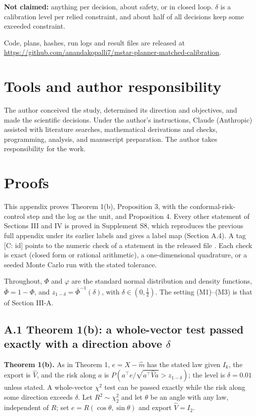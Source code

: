 \documentclass{ieeeaccess}
\begin{document}
\textbf{Not claimed:} anything per decision, about safety, or in closed loop. $\delta$ is a calibration level per relied constraint, and about half of all decisions keep some exceeded constraint.

Code, plans, hashes, run logs and result files are released at \url{https://github.com/anandakopalli7/mstar-planner-matched-calibration}.

\section*{Tools and author responsibility}
The author conceived the study, determined its direction and objectives, and made the scientific decisions. Under the author's instructions, Claude (Anthropic) assisted with literature searches, mathematical derivations and checks, programming, analysis, and manuscript preparation. The author takes responsibility for the work.

\appendices
\section{\break Proofs}
This appendix proves Theorem 1(b), Proposition 3, with the conformal-risk-control step and the log as the unit, and Proposition 4. Every other statement of Sections III and IV is proved in Supplement S8, which reproduces the previous full appendix under its earlier labels and gives a label map (Section A.4). A tag [C: id] points to the numeric check of a statement in the released file . Each check is exact (closed form or rational arithmetic), a one-dimensional quadrature, or a seeded Monte Carlo run with the stated tolerance.

Throughout, $\Phi$ and $\varphi$ are the standard normal distribution and density functions, $\bar{\Phi} = 1 - \Phi$, and $z_{1-\delta} = \bar{\Phi}^{-1}(\delta)$, with $\delta \in (0, \tfrac{1}{2})$. The setting (M1)--(M3) is that of Section III-A.

\subsection*{A.1 Theorem 1(b): a whole-vector test passed exactly with a direction above $\delta$}
\textbf{Theorem 1(b).} As in Theorem 1, $e = X - \hat{m}$ has the stated law given $I_{k}$, the export is $\hat{V}$, and the risk along $a$ is $P(a^{\top}e/\sqrt{a^{\top}\hat{V}a} > z_{1-\delta})$; the level is $\delta = 0.01$ unless stated. A whole-vector $\chi^{2}$ test can be passed exactly while the risk along some direction exceeds $\delta$. Let $R^{2} \sim \chi_{2}^{2}$ and let $\theta$ be an angle with any law, independent of $R$; set $e = R(\cos \theta, \sin \theta)$ and export $\hat{V} = I_{2}$.
\end{document}
